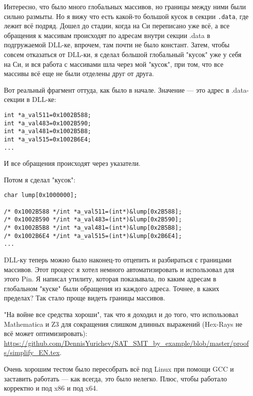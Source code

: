 Интересно, что было много глобальных массивов, но границы между ними были сильно размыты.
Но я вижу что есть какой-то большой кусок в секции \verb|.data|, где лежит всё подряд.
Дошел до стадии, когда на Си переписано уже всё, а все обращения к массивам происходят по адресам внутри секции .data в 
подгружаемой DLL-ке, впрочем, там почти не было констант.
Затем, чтобы совсем отказаться от DLL-ки, я сделал большой глобальный "кусок" уже у себя на Си, и вся работа с массивами
шла через мой "кусок", при том, что все массивы всё еще не были отделены друг от друга.

Вот реальный фрагмент оттуда, как было в начале.
Значение --- это адрес в .data-секции в DLL-ке:

\begin{lstlisting}
int *a_val511=0x1002B588;
int *a_val483=0x1002B590;
int *a_val481=0x1002B5B8;
int *a_val515=0x1002B6E4;
...
\end{lstlisting}

И все обращения происходят через указатели.

Потом я сделал "кусок":

\begin{lstlisting}
char lump[0x1000000];

/* 0x1002B588 */int *a_val511=(int*)&lump[0x2B588];
/* 0x1002B590 */int *a_val483=(int*)&lump[0x2B590];
/* 0x1002B5B8 */int *a_val481=(int*)&lump[0x2B5B8];
/* 0x1002B6E4 */int *a_val515=(int*)&lump[0x2B6E4];
...
\end{lstlisting}

DLL-ку теперь можно было наконец-то отцепить и разбираться с границами массивов.
Этот процесс я хотел немного автоматизировать и использовал для этого Pin.
Я написал утилиту, которая показывала, по каким адресам в глобальном "куске" были обращения
из каждого адреса. Точнее, в каких пределах?
Так стало проще видеть границы массивов.

"На войне все средства хороши", так что я доходил и до того, что использовал Mathematica и Z3 для сокращения слишком длинных
выражений (Hex-Rays не всё может оптимизировать): \\
\url{https://github.com/DennisYurichev/SAT_SMT_by_example/blob/master/proofs/simplify_EN.tex}.

Очень хорошим тестом было пересобрать всё под Linux при помощи GCC и заставить работать --- как всегда, это было нелегко.
Плюс, чтобы работало корректно и под x86 и под x64.


